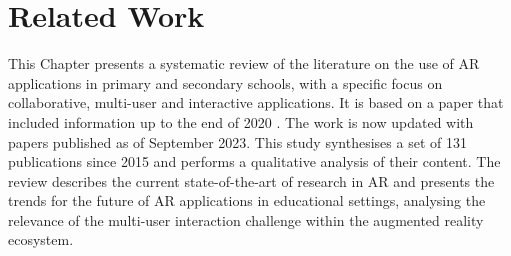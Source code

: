 





\ifpdf
\graphicspath{{Sota/figures/PNG/}{./figures/}{Sota/figures/PDF/}{Sota/figures/}}
\else
\graphicspath{{Sota/figures/EPS/}{Sota/figures/}{./figures}}
\fi

\newcommand{\papersWithNumStudentInfo}[0]{103 }
\newcommand{\papersWithEvaluation}[0]{65 }
\newcommand{\hardwareHMD}[0]{8 }
\newcommand{\papersAfterTwentyEighteen}[0]{104 }
\newcommand{\allPapers}[0]{3070 }
\newcommand{\duplPapers}[0]{395 }
\newcommand{\papersCheckAbstract}[0]{2675 }
\newcommand{\papersToRead}[0]{359 }
\newcommand{\papersExludedAfterReading}[0]{228 }
\newcommand{\papersSelected}[0]{131 }
\newcommand{\papersMultiuser}[0]{23 }
\newcommand{\papersCollab}[0]{16 }
\newcommand{\papersGames}[0]{17 }

\chapter{Related Work}
\label{chap:sota}

This Chapter presents a systematic review of the literature on the use of AR \mbox{applications} in primary and secondary schools, with a specific focus on collaborative, multi-user and interactive applications. It is based on a paper that included information up to the end of 2020 \citep{10.3897/jucs.76535}. The work is now updated with papers published as of September 2023. This study synthesises a set of 131 publications since 2015 and performs a qualitative analysis of their content. The review describes the current state-of-the-art of research in AR and presents the trends for the future of AR \mbox{applications} in educational settings, analysing the relevance of the multi-user interaction challenge within the augmented reality ecosystem.


